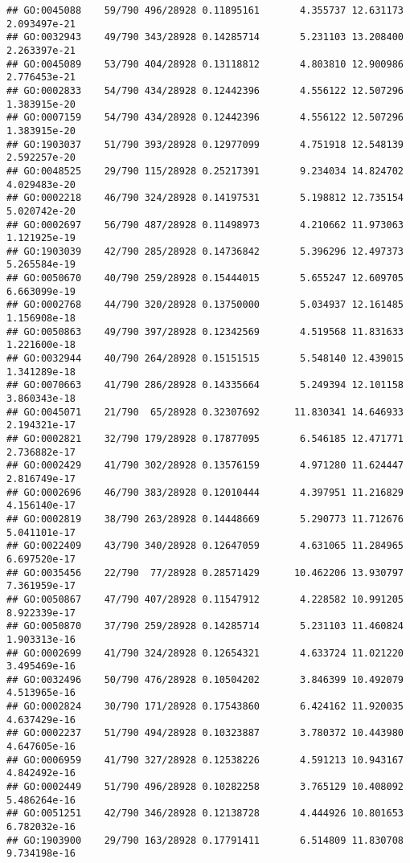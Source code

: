 \documentclass[
]{article}
\begin{document}
\begin{verbatim}
## GO:0045088    59/790 496/28928 0.11895161       4.355737 12.631173 2.093497e-21
## GO:0032943    49/790 343/28928 0.14285714       5.231103 13.208400 2.263397e-21
## GO:0045089    53/790 404/28928 0.13118812       4.803810 12.900986 2.776453e-21
## GO:0002833    54/790 434/28928 0.12442396       4.556122 12.507296 1.383915e-20
## GO:0007159    54/790 434/28928 0.12442396       4.556122 12.507296 1.383915e-20
## GO:1903037    51/790 393/28928 0.12977099       4.751918 12.548139 2.592257e-20
## GO:0048525    29/790 115/28928 0.25217391       9.234034 14.824702 4.029483e-20
## GO:0002218    46/790 324/28928 0.14197531       5.198812 12.735154 5.020742e-20
## GO:0002697    56/790 487/28928 0.11498973       4.210662 11.973063 1.121925e-19
## GO:1903039    42/790 285/28928 0.14736842       5.396296 12.497373 5.265584e-19
## GO:0050670    40/790 259/28928 0.15444015       5.655247 12.609705 6.663099e-19
## GO:0002768    44/790 320/28928 0.13750000       5.034937 12.161485 1.156908e-18
## GO:0050863    49/790 397/28928 0.12342569       4.519568 11.831633 1.221600e-18
## GO:0032944    40/790 264/28928 0.15151515       5.548140 12.439015 1.341289e-18
## GO:0070663    41/790 286/28928 0.14335664       5.249394 12.101158 3.860343e-18
## GO:0045071    21/790  65/28928 0.32307692      11.830341 14.646933 2.194321e-17
## GO:0002821    32/790 179/28928 0.17877095       6.546185 12.471771 2.736882e-17
## GO:0002429    41/790 302/28928 0.13576159       4.971280 11.624447 2.816749e-17
## GO:0002696    46/790 383/28928 0.12010444       4.397951 11.216829 4.156140e-17
## GO:0002819    38/790 263/28928 0.14448669       5.290773 11.712676 5.041101e-17
## GO:0022409    43/790 340/28928 0.12647059       4.631065 11.284965 6.697520e-17
## GO:0035456    22/790  77/28928 0.28571429      10.462206 13.930797 7.361959e-17
## GO:0050867    47/790 407/28928 0.11547912       4.228582 10.991205 8.922339e-17
## GO:0050870    37/790 259/28928 0.14285714       5.231103 11.460824 1.903313e-16
## GO:0002699    41/790 324/28928 0.12654321       4.633724 11.021220 3.495469e-16
## GO:0032496    50/790 476/28928 0.10504202       3.846399 10.492079 4.513965e-16
## GO:0002824    30/790 171/28928 0.17543860       6.424162 11.920035 4.637429e-16
## GO:0002237    51/790 494/28928 0.10323887       3.780372 10.443980 4.647605e-16
## GO:0006959    41/790 327/28928 0.12538226       4.591213 10.943167 4.842492e-16
## GO:0002449    51/790 496/28928 0.10282258       3.765129 10.408092 5.486264e-16
## GO:0051251    42/790 346/28928 0.12138728       4.444926 10.801653 6.782032e-16
## GO:1903900    29/790 163/28928 0.17791411       6.514809 11.830708 9.734198e-16

\end{verbatim}
\end{document}
